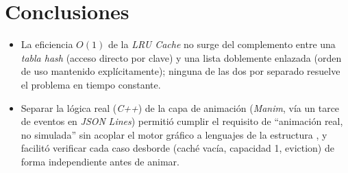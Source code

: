 \documentclass[a4paper, table]{article}
\begin{document}
\section{Conclusiones}

\begin{itemize}
    \item La eficiencia $O(1)$ de la \textit{LRU Cache} no surge del complemento entre una \textit{tabla hash} (acceso directo por clave) y una  lista doblemente enlazada (orden de uso mantenido explícitamente); ninguna de las dos por separado resuelve el problema en tiempo constante.

    \item Separar la lógica real (\textit{C++}) de la capa de animación (\textit{Manim}, vía un tarce de eventos en \textit{JSON} \textit{Lines}) permitió cumplir el requisito de “animación real, no simulada” sin acoplar el motor gráfico a lenguajes de la estructura , y facilitó verificar cada caso desborde (caché vacía, capacidad 1, eviction) de forma independiente antes de animar.
\end{itemize}
\end{document}
